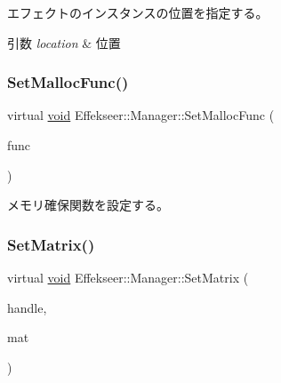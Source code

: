 エフェクトのインスタンスの位置を指定する。 


\begin{DoxyParams}{引数}
{\em location} & 位置 \\
\hline
\end{DoxyParams}
\mbox{\label{class_effekseer_1_1_manager_af1b85d9b77c7e923a399c3cc84a34fbc}} 
\subsubsection{\texorpdfstring{Set\+Malloc\+Func()}{SetMallocFunc()}}
{\footnotesize\ttfamily virtual \mbox{\hyperlink{namespace_effekseer_ab34c4088e512200cf4c2716f168deb56}{void}} Effekseer\+::\+Manager\+::\+Set\+Malloc\+Func (\begin{DoxyParamCaption}\item[{\mbox{\hyperlink{namespace_effekseer_a2f9a04a7b2d08a8f2173ce47e57ff742}{Malloc\+Func}}}]{func }\end{DoxyParamCaption})\hspace{0.3cm}{\ttfamily [pure virtual]}}



メモリ確保関数を設定する。 

\mbox{\label{class_effekseer_1_1_manager_a69d0768ed69c30d3993ececa6159c4dd}} 
\subsubsection{\texorpdfstring{Set\+Matrix()}{SetMatrix()}}
{\footnotesize\ttfamily virtual \mbox{\hyperlink{namespace_effekseer_ab34c4088e512200cf4c2716f168deb56}{void}} Effekseer\+::\+Manager\+::\+Set\+Matrix (\begin{DoxyParamCaption}\item[{\mbox{\hyperlink{namespace_effekseer_afba58b8d812da862190e9bbfc040824a}{Handle}}}]{handle,  }\item[{const \mbox{\hyperlink{struct_effekseer_1_1_matrix43}{Matrix43}} \&}]{mat }\end{DoxyParamCaption})\hspace{0.3cm}{\ttfamily [pure virtual]}}



